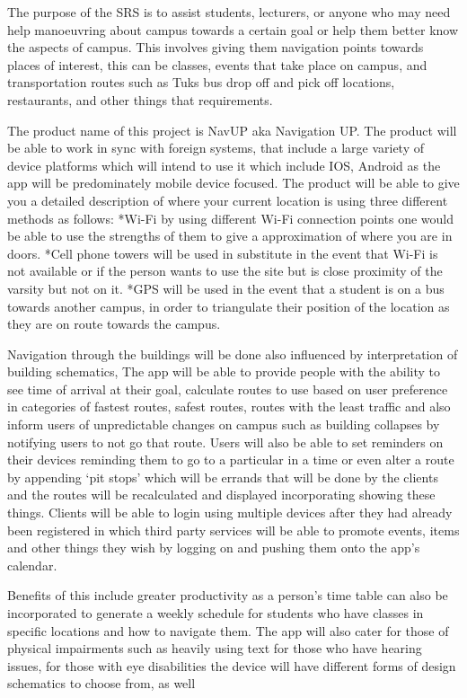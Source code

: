 The purpose of the SRS is to assist students, lecturers, or anyone who may need help manoeuvring about campus towards a certain goal or help them better know the aspects of campus. This involves giving them navigation points towards places of interest, this can be classes, events that take place on campus, and transportation routes such as Tuks bus drop off and pick off locations, restaurants, and other things that requirements.

The product name of this project is NavUP aka Navigation UP.
The product will be able to work in sync with foreign systems, that include a large variety of device platforms which will intend to use it which include IOS, Android as the app will be predominately mobile device focused.
The product will be able to give you a detailed description of where your current location is using three different methods as follows:
*Wi-Fi by using different Wi-Fi connection points one would be able to use the strengths of them to give a approximation of where you are in doors.
*Cell phone towers will be used in substitute in the event that Wi-Fi is not available or if the person wants to use the site but is close proximity of the varsity but not on it.
*GPS will be used in the event that a student is on a bus towards another campus, in order to triangulate their position of the location as they are on route towards the campus.

Navigation through the buildings will be done also influenced by interpretation of building schematics,
The app will be able to provide people with the ability to see time of arrival at their goal, calculate routes to use based on user preference in categories of fastest routes, safest routes, routes with the least traffic and also inform users of unpredictable changes on campus such as building collapses by notifying users to not go that route. Users will also be able to set reminders on their devices reminding them to go to a particular in a time or even alter a route by appending ‘pit stops’ which will be errands that will be done by the clients and the routes will be recalculated and displayed incorporating showing these things.
Clients will be able to login using multiple devices after they had already been registered in which third party services will be able to promote events, items and other things they wish by logging on and pushing them onto the app’s calendar.

Benefits of this include greater productivity as a person’s time table can also be incorporated to generate a weekly schedule for students who have classes in specific locations and how to navigate them.
The app will also cater for those of physical impairments such as heavily using text for those who have hearing issues, for those with eye disabilities the device will have different forms of design schematics to choose from, as well  


